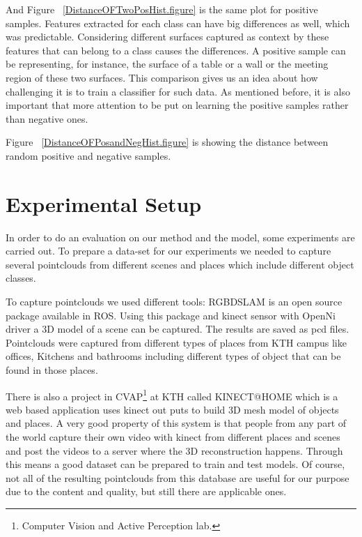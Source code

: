 And Figure ~\ref{DistanceOFTwoPosHist.figure} is the same plot for positive samples. 
Features extracted for each class can have big differences as well, which was predictable. 
Considering different surfaces captured as context by these features that can belong to a class causes the differences. 
A positive sample can be representing, for instance, the surface of a table or a wall or the meeting region of these 
two surfaces. 
This comparison gives us an idea about how challenging it is to train a classifier for such data.
As mentioned before, it is also important that more attention to be put on learning the positive samples rather than 
negative ones. 



Figure ~\ref{DistanceOFPosandNegHist.figure} is showing the distance between random positive and negative samples.


\section{Experimental Setup}
\label{ExperimentalSetup.sec}
In order to do an evaluation on our method and the model, some experiments are carried out.
To prepare a data-set for our experiments we needed to capture several pointclouds from different scenes and places which 
include different object classes.


To capture pointclouds we used different tools:
RGBDSLAM \cite{RGBDSLAM} is an open source  package available in ROS. 
Using this package and kinect sensor with OpenNi driver a 3D model of a scene can be captured. 
The results are saved as pcd files.
Pointclouds were captured from different types of places from KTH campus like offices, Kitchens and bathrooms including 
different types of object that can be found in those places.

There is also a project in CVAP\footnote{Computer Vision and Active Perception lab.} at KTH called KINECT@HOME \cite{aydemir2012kinect} which is a web based application uses
kinect out puts to build 3D mesh model of objects and places. 
A very good property of this system is that people from any part of the world capture their own video with kinect from different 
places and scenes and post the videos to a server where the 3D reconstruction happens. 
Through this means a good dataset can be prepared to train and test models.
Of course, not all of the resulting pointclouds from this database are useful for our purpose due to the content and
quality, but still there are applicable ones.

